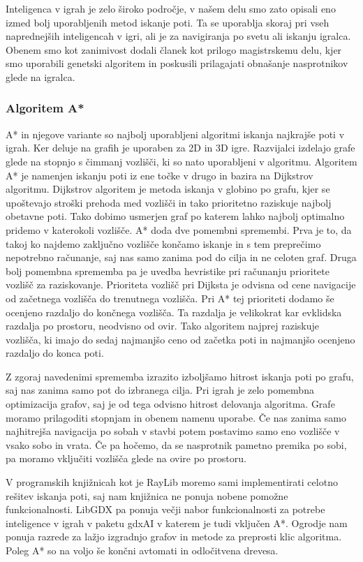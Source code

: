 \documentclass[12pt,a4paper,twoside]{book}
\begin{document}
Inteligenca v igrah je zelo široko področje, v našem delu smo zato opisali eno izmed bolj uporabljenih metod iskanje poti. Ta se uporablja skoraj pri vseh naprednejših inteligencah v igri, ali je za navigiranja po svetu ali iskanju igralca. Obenem smo kot zanimivost dodali članek kot prilogo magistrskemu delu, kjer smo uporabili genetski algoritem in poskusili prilagajati obnašanje nasprotnikov glede na igralca.

\subsubsection{Algoritem A*}

A* in njegove variante so najbolj uporabljeni algoritmi iskanja najkrajše poti v igrah. Ker deluje na grafih je uporaben za 2D in 3D igre. Razvijalci izdelajo grafe glede na stopnjo s čimmanj vozlišči, ki so nato uporabljeni v algoritmu. Algoritem A* je namenjen iskanju poti iz ene točke v drugo in bazira na Dijkstrov algoritmu. Dijkstrov algoritem je metoda iskanja v globino po grafu, kjer se upoštevajo stroški prehoda med vozlišči in tako prioritetno raziskuje najbolj obetavne poti. Tako dobimo usmerjen graf po katerem lahko najbolj optimalno pridemo v katerokoli vozlišče. A* doda dve pomembni spremembi. Prva je to, da takoj ko najdemo zaključno vozlišče končamo iskanje in s tem preprečimo nepotrebno računanje, saj nas samo zanima pod do cilja in ne celoten graf. Druga bolj pomembna sprememba pa je uvedba hevristike pri računanju prioritete vozlišč za raziskovanje. Prioriteta vozlišč pri Dijksta je odvisna od cene navigacije od začetnega vozlišča do trenutnega vozlišča. Pri A* tej prioriteti dodamo še ocenjeno razdaljo do končnega vozlišča. Ta razdalja je velikokrat kar evklidska razdalja po prostoru, neodvisno od ovir. Tako algoritem najprej raziskuje vozlišča, ki imajo do sedaj najmanjšo ceno od začetka poti in najmanjšo ocenjeno razdaljo do konca poti. 

Z zgoraj navedenimi sprememba izrazito izboljšamo hitrost iskanja poti po grafu, saj nas zanima samo pot do izbranega cilja. Pri igrah je zelo pomembna optimizacija grafov, saj je od tega odvisno hitrost delovanja algoritma. Grafe moramo prilagoditi stopnjam in obenem namenu uporabe. Če nas zanima samo najhitrejša navigacija po sobah v stavbi potem postavimo samo eno vozlišče v vsako sobo in vrata. Če pa hočemo, da se nasprotnik pametno premika po sobi, pa moramo vključiti vozlišča glede na ovire po prostoru.

V programskih knjižnicah kot je RayLib moremo sami implementirati celotno rešitev iskanja poti, saj nam knjižnica ne ponuja nobene pomožne funkcionalnosti. LibGDX pa ponuja večji nabor funkcionalnosti za potrebe inteligence v igrah v paketu gdxAI v katerem je tudi vključen A*. Ogrodje nam ponuja razrede za lažjo izgradnjo grafov in metode za preprosti klic algoritma. Poleg A* so na voljo še končni avtomati in odločitvena drevesa.
\end{document}
